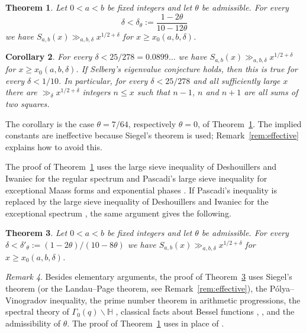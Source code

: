 \documentclass[11pt]{amsart}
\newtheorem{theorem}{Theorem}[section]
\newtheorem{corollary}[theorem]{Corollary}
\theoremstyle{remark}
\newtheorem{remark}[theorem]{Remark}
\theoremstyle{definition}
\numberwithin{equation}{section}
\newcommand{\Hb}{\mathbb{H}}
\begin{document}
\begin{theorem}\label{thm:main}
Let $0<a<b$ be fixed integers and let $\theta$ be admissible. For every
\[
\delta<\delta_\theta:=\frac{1-2\theta}{10-12\theta}
\]
we have $S_{a,b}(x)\gg_{a,b,\delta}x^{1/2+\delta}$ for $x\ge x_0(a,b,\delta)$.
\end{theorem}

\begin{corollary}\label{cor:main}
For every $\delta<25/278=0.0899\ldots$ we have $S_{a,b}(x)\gg_{a,b,\delta}x^{1/2+\delta}$ for $x\ge x_0(a,b,\delta)$. If Selberg's eigenvalue conjecture holds, then this is true for every $\delta<1/10$. In particular, for every $\delta<25/278$ and all sufficiently large $x$ there are $\gg_\delta x^{1/2+\delta}$ integers $n\le x$ such that $n-1$, $n$ and $n+1$ are all sums of two squares.
\end{corollary}

The corollary is the case $\theta=7/64$, respectively $\theta=0$, of Theorem~\ref{thm:main}. The implied constants are ineffective because Siegel's theorem is used; Remark~\ref{rem:effective} explains how to avoid this.

The proof of Theorem~\ref{thm:main} uses the large sieve inequality of Deshouillers and Iwaniec for the regular spectrum \cite[Theorem~2]{DI} and Pascadi's large sieve inequality for exceptional Maass forms and exponential phases \cite[Theorem~2]{Pas}. If Pascadi's inequality is replaced by the large sieve inequality of Deshouillers and Iwaniec for the exceptional spectrum \cite[Theorem~5]{DI}, the same argument gives the following.

\begin{theorem}\label{thm:DI}
Let $0<a<b$ be fixed integers and let $\theta$ be admissible. For every $\delta<\delta'_\theta:=(1-2\theta)/(10-8\theta)$ we have $S_{a,b}(x)\gg_{a,b,\delta}x^{1/2+\delta}$ for $x\ge x_0(a,b,\delta)$.
\end{theorem}

\begin{remark}\label{rem:inputs}
Besides elementary arguments, the proof of Theorem~\ref{thm:DI} uses Siegel's theorem (or the Landau--Page theorem, see Remark~\ref{rem:effective}), the P\'olya--Vinogradov inequality, the prime number theorem in arithmetic progressions, the spectral theory of $\Gamma_0(q)\backslash\Hb$ \cite{Iw}, classical facts about Bessel functions \cite{Wat,GR}, \cite[Theorems~2 and~5]{DI}, and the admissibility of $\theta$. The proof of Theorem~\ref{thm:main} uses \cite[Theorem~2]{Pas} in place of \cite[Theorem~5]{DI}.
\end{remark}
\end{document}
